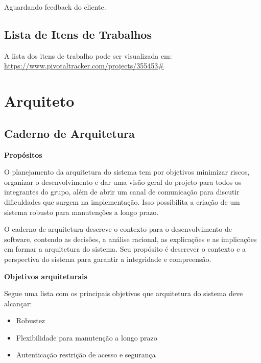 \documentclass[12pt,letterpaper]{article}
\begin{document}
Aguardando feedback do cliente.

\pagebreak

\subsection{Lista de Itens de Trabalhos}

A lista dos itens de trabalho pode ser visualizada em: \url{https://www.pivotaltracker.com/projects/355453#}

\pagebreak



\section{Arquiteto}

\subsection{Caderno de Arquitetura}

\vspace{1cm}
{\large {\bf Propósitos}}
\vspace{0.5cm}

O planejamento da arquitetura do sistema tem por objetivos minimizar riscos, organizar o desenvolvimento e
dar uma visão geral do projeto para todos os integrantes do grupo, além de abrir um canal de comunicação para discutir dificuldades que surgem na implementação. Isso possibilita a criação de um sistema robusto para manutenções a longo prazo.

O caderno de arquitetura descreve o contexto para o desenvolvimento de software, 
contendo as decisões, a análise racional, as explicações e as implicações em formar a 
arquitetura do sistema. Seu propósito é descrever o contexto e a perspectiva do sistema para 
garantir a integridade e compreensão.

\vspace{1cm}
{\large {\bf Objetivos arquiteturais}}
\vspace{0.5cm}

Segue uma lista com os principais objetivos que arquitetura do sistema deve alcançar:
\begin{itemize}
\item{}Robustez
\item{}Flexibilidade para manutenção a longo prazo
\item{}Autenticação restrição de acesso e segurança
\end{itemize}
\pagebreak
\end{document}
